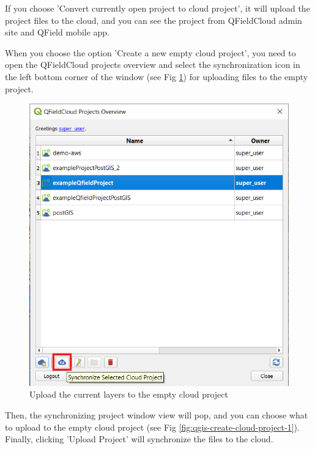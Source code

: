 \documentclass{article}
\begin{document}
If you choose 'Convert currently open project to cloud project', it will upload the project files to the cloud, and you can see the project from QFieldCloud admin site and QField mobile app.

When you choose the option 'Create a new empty cloud project', you need to open the QFieldCloud projects overview and select the synchronization icon in the left bottom corner of the window (see Fig \ref{fig:qgis-create-empty-project}) for uploading files to the empty project.

\begin{figure}[H]
    \centering
    \includegraphics[width=1\textwidth]{qgis-create-empty-project.png}
    \caption{Upload the current layers to the empty cloud project}
    \label{fig:qgis-create-empty-project}
\end{figure}

Then, the synchronizing project window view will pop, and you can choose what to upload to the empty cloud project (see Fig \ref{fig:qgis-create-cloud-project-1}). Finally, clicking 'Upload Project' will synchronize the files to the cloud.
\end{document}
